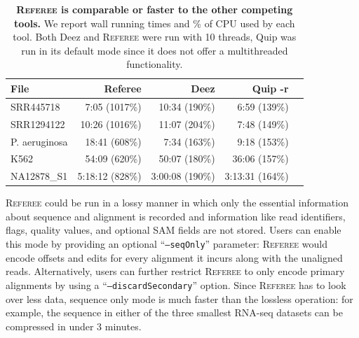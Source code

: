 \documentclass[12pt]{cmuthesis}
\newcommand{\refer}{\textsc{Referee}\xspace}
\begin{document}
  \begin{table}[ht]
    \caption{\textbf{\refer is comparable or faster to the other competing tools.} We report wall running times and \% of CPU used by each tool. Both Deez and \refer were run with 10 threads, Quip was run in its default mode since it does not offer a multithreaded functionality.}
    \label{tab:runtimes}
    \centering
    \begin{tabular}{l r r r r }
    \toprule
    File & Referee & Deez & Quip -r \\
    \midrule
    SRR445718 		& 7:05 (1017\%) & 10:34 (190\%) & 6:59 (139\%) \\
    SRR1294122 		& 10:26 (1016\%) & 11:07 (204\%) & 7:48 (149\%) \\
    P. aeruginosa 	& 18:41 (608\%) & 7:34 (163\%) & 9:18 (153\%) \\
    K562 			& 54:09 (620\%) & 50:07 (180\%) & 36:06 (157\%) \\
    NA12878\_S1 	& 5:18:12 (828\%) & 3:00:08 (190\%) & 3:13:31 (164\%) \\
    \bottomrule
    \end{tabular}
  \end{table}

  \refer could be run in a lossy manner in which only the essential information about sequence and alignment is recorded and information like read identifiers, flags, quality values, and optional SAM fields are not stored. Users can enable this mode by providing an optional ``\texttt{--seqOnly}'' parameter: \refer would encode offsets and edits for every alignment it incurs along with the unaligned reads. Alternatively, users can further restrict \refer to only encode primary alignments by using a ``\texttt{--discardSecondary}'' option. Since \refer has to look over less data, sequence only mode is much faster than the lossless operation: for example, the sequence in either of the three smallest RNA-seq datasets can be compressed in under 3 minutes.
\end{document}
